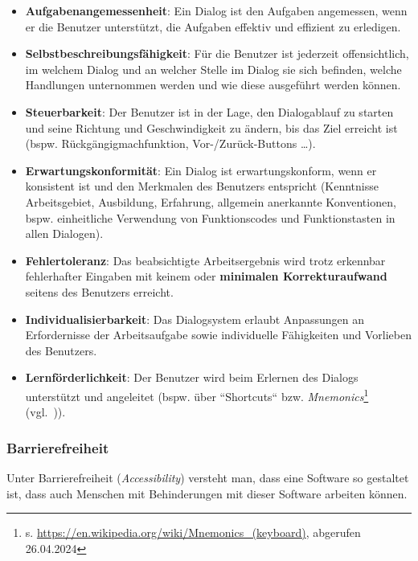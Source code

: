 \begin{itemize}
    \item \textbf{Aufgabenangemessenheit}: Ein Dialog ist den Aufgaben angemessen, wenn er die Benutzer unterstützt, die Aufgaben effektiv und effizient zu erledigen.
    \item \textbf{Selbstbeschreibungsfähigkeit}: Für die Benutzer ist jederzeit offensichtlich, im welchem Dialog und an welcher Stelle im Dialog sie sich befinden, welche Handlungen unternommen werden und wie diese ausgeführt werden können.
    \item \textbf{Steuerbarkeit}: Der Benutzer ist in der Lage, den Dialogablauf zu starten und seine Richtung und Geschwindigkeit zu ändern, bis das Ziel erreicht ist (bspw. Rückgängigmachfunktion, Vor-/Zurück-Buttons \ldots).
    \item \textbf{Erwartungskonformität}: Ein Dialog ist erwartungskonform, wenn er konsistent ist und den Merkmalen des Benutzers entspricht (Kenntnisse Arbeitsgebiet, Ausbildung, Erfahrung, allgemein anerkannte Konventionen, bspw. einheitliche Verwendung von Funktionscodes und Funktionstasten in allen Dialogen).
    \item \textbf{Fehlertoleranz}: Das beabsichtigte Arbeitsergebnis wird trotz erkennbar fehlerhafter Eingaben mit keinem oder \textbf{minimalen Korrekturaufwand} seitens des Benutzers erreicht.
    \item \textbf{Individualisierbarkeit}: Das Dialogsystem erlaubt Anpassungen an Erfordernisse der Arbeitsaufgabe sowie individuelle Fähigkeiten und Vorlieben des Benutzers.
    \item \textbf{Lernförderlichkeit}: Der Benutzer wird beim Erlernen des Dialogs unterstützt und angeleitet (bspw. über ``Shortcuts`` bzw. \textit{Mnemonics}\footnote{
        s. \url{https://en.wikipedia.org/wiki/Mnemonics_(keyboard)}, abgerufen 26.04.2024
    } (vgl.~\cite[147]{Rau07f})).

\end{itemize}

\subsubsection*{Barrierefreiheit}
Unter Barrierefreiheit (\textit{Accessibility}) versteht man, dass eine Software so gestaltet ist, dass auch Menschen mit Behinderungen mit dieser Software arbeiten können.
